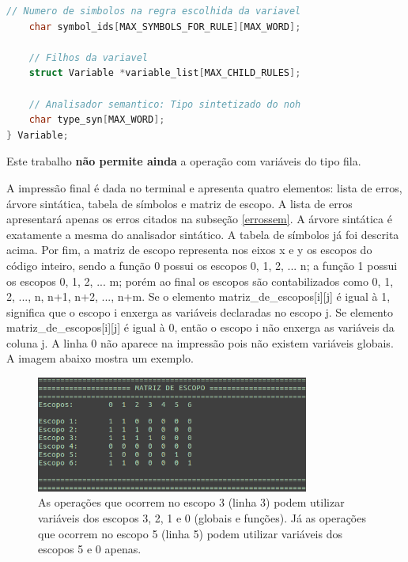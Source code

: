 \documentclass[12pt]{article}
\begin{document}
\begin{itemize}
\begin{lstlisting}[language=C]
    // Numero de simbolos na regra escolhida da variavel
    char symbol_ids[MAX_SYMBOLS_FOR_RULE][MAX_WORD];
    
    // Filhos da variavel
    struct Variable *variable_list[MAX_CHILD_RULES];
    
    // Analisador semantico: Tipo sintetizado do noh
    char type_syn[MAX_WORD];
} Variable;
\end{lstlisting}
\end{itemize}

\indent Este trabalho \textbf{não permite ainda} a operação com variáveis do tipo fila.

\indent A impressão final é dada no terminal e apresenta quatro elementos: lista de erros, árvore sintática, tabela de símbolos e matriz de escopo. A lista de erros apresentará apenas os erros citados na subseção \ref{errossem}. A árvore sintática é exatamente a mesma do analisador sintático. A tabela de símbolos já foi descrita acima. Por fim, a matriz de escopo representa nos eixos x e y os escopos do código inteiro, sendo a função 0 possui os escopos 0, 1, 2, ... n; a função 1 possui os escopos 0, 1, 2, ... m; porém ao final os escopos são contabilizados como 0, 1, 2, ..., n, n+1, n+2, ..., n+m. Se o elemento matriz\_de\_escopos[i][j] é igual à 1, significa que o escopo i enxerga as variáveis declaradas no escopo j. Se elemento matriz\_de\_escopos[i][j] é igual à 0, então o escopo i não enxerga as variáveis da coluna j. A linha 0 não aparece na impressão pois não existem variáveis globais. A imagem abaixo mostra um exemplo.

\begin{figure}[!ht]
  \centering
  \includegraphics[width=0.8\textwidth]{escopo.png}
  \caption{As operações que ocorrem no escopo 3 (linha 3) podem utilizar variáveis dos escopos 3, 2, 1 e 0 (globais e funções). Já as operações que ocorrem no escopo 5 (linha 5) podem utilizar variáveis dos escopos 5 e 0 apenas.} \label{fig:escopos}
\end{figure}
\end{document}
